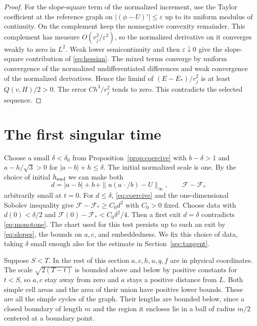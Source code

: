 \begin{proof}
For the slope-square term of the normalized increment, use the Taylor
coefficient at the reference graph on \(|(\phi-U)'|\le\varepsilon\)
up to its uniform modulus of continuity. On the complement keep the
nonnegative convexity remainder. This complement has measure
\(O(r_j^2/\varepsilon^2)\), so the normalized derivative on it converges
weakly to zero in \(L^2\). Weak lower semicontinuity and then
\(\varepsilon\downarrow0\) give the slope-square contribution of
\eqref{eq:hessian}. The mixed terms converge by uniform convergence
of the normalized undifferentiated differences and weak convergence
of the normalized derivatives. Hence the liminf of
\((E-E_*)/r_j^2\) is at least \(Q(v,H)/2>0\). The error \(Ch^3/r_j^2\)
tends to zero. This contradicts the selected sequence.
\end{proof}


\section{The first singular time}\label{sec:lifetime}

Choose a small \(\delta<\delta_0\) from Proposition~\ref{prop:coercive}
with \(b-\delta>1\) and \(a-h/\sqrt3>0\) for
\(|a-b|+h\le\delta\). The initial normalized scale is one. By the choice
of initial \(h_{\rm end}\) we can make both
\[
 d=|a-b|+h+\|u(a\,\cdot/b)-U\|_\infty,\qquad
 \mathcal F-\mathcal F_*
\]
arbitrarily small at \(t=0\). For \(d\le\delta\),
\eqref{eq:coercive} and the one-dimensional Sobolev inequality give
\(\mathcal F-\mathcal F_*\ge C_0 d^2\) with \(C_0>0\) fixed.
Choose data with \(d(0)<\delta/2\) and
\(\mathcal F(0)-\mathcal F_*<C_0\delta^2/4\).
Then a first exit \(d=\delta\) contradicts \eqref{eq:monotone}.
The chart used for this test persists up to such an exit by
\eqref{eq:slopes}, the bounds on \(a,c\), and embeddedness.
We fix this choice of data, taking \(\delta\) small enough also for
the estimate in Section~\ref{sec:tangent}.

Suppose \(S<T\). In the rest of this section \(a,c,h,u,q,f\) are
in physical coordinates. The scale \(\sqrt{2(T-t)}\) is bounded
above and below by positive constants for \(t<S\), so \(a,c\)
stay away from zero and \(a\) stays a positive distance from \(L\).
Both simple cell areas and the area of their union have positive
lower bounds. These are all the simple cycles of the graph.
Their lengths are bounded below, since a closed boundary of length
\(m\) and the region it encloses lie in a ball of radius \(m/2\)
centered at a boundary point.

